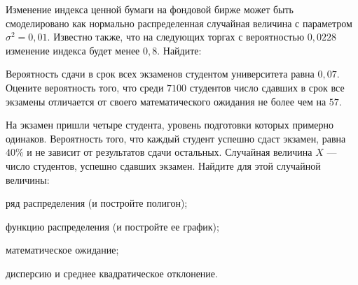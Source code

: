 \vfil

\begin{zkrPlain}{25}\noindent 
	Изменение индекса ценной бумаги на фондовой бирже может быть смоделировано как нормально распределенная случайная величина с параметром $\sigma^2 = 0{,}01$. Известно также, что на следующих торгах с вероятностью $0{,}0228$ изменение индекса будет менее $0{,}8$. Найдите: \par {}
 
\end{zkrPlain}

\vfil

\begin{zkrPlain}{25}\noindent 
	Вероятность сдачи в срок всех экзаменов студентом университета равна $ 0{,}07 $. Оцените вероятность того, что среди $ 7100 $ студентов число сдавших в срок все экзамены отличается от своего математического ожидания не более чем на $ 57 $. 
 
\end{zkrPlain}

\newpage\setcounter{zad}{0}\setcounter{footnote}{0}



\begin{zkrPlain}{25}\noindent 
	На экзамен пришли четыре студента, уровень подготовки которых примерно одинаков. Вероятность того, что каждый студент успешно сдаст экзамен, равна $40\%$ и не зависит от результатов сдачи остальных. Случайная величина $X$ --- число студентов, успешно сдавших экзамен.  Найдите для этой случайной величины: \par \smallskip\small{ \par \zz ряд распределения (и постройте полигон); \par \zz функцию распределения (и постройте ее график); \par \zz математическое ожидание; \par \zz дисперсию и среднее квадратическое отклонение.\par \par}
 
\end{zkrPlain}

\vfil

